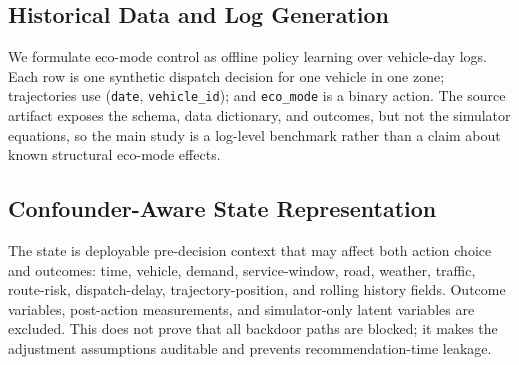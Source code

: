 \documentclass[a4paper,conference]{IEEEtran}
\begin{document}
\subsection{Historical Data and Log Generation}
We formulate eco-mode control as offline policy learning over vehicle-day logs. Each row is one synthetic dispatch decision for one vehicle in one zone; trajectories use (\texttt{date}, \texttt{vehicle\_id}); and \texttt{eco\_mode} is a binary action. The source artifact exposes the schema, data dictionary, and outcomes, but not the simulator equations, so the main study is a log-level benchmark rather than a claim about known structural eco-mode effects.

\subsection{Confounder-Aware State Representation}
The state is deployable pre-decision context that may affect both action choice and outcomes: time, vehicle, demand, service-window, road, weather, traffic, route-risk, dispatch-delay, trajectory-position, and rolling history fields. Outcome variables, post-action measurements, and simulator-only latent variables are excluded. This does not prove that all backdoor paths are blocked; it makes the adjustment assumptions auditable and prevents recommendation-time leakage.
\end{document}
